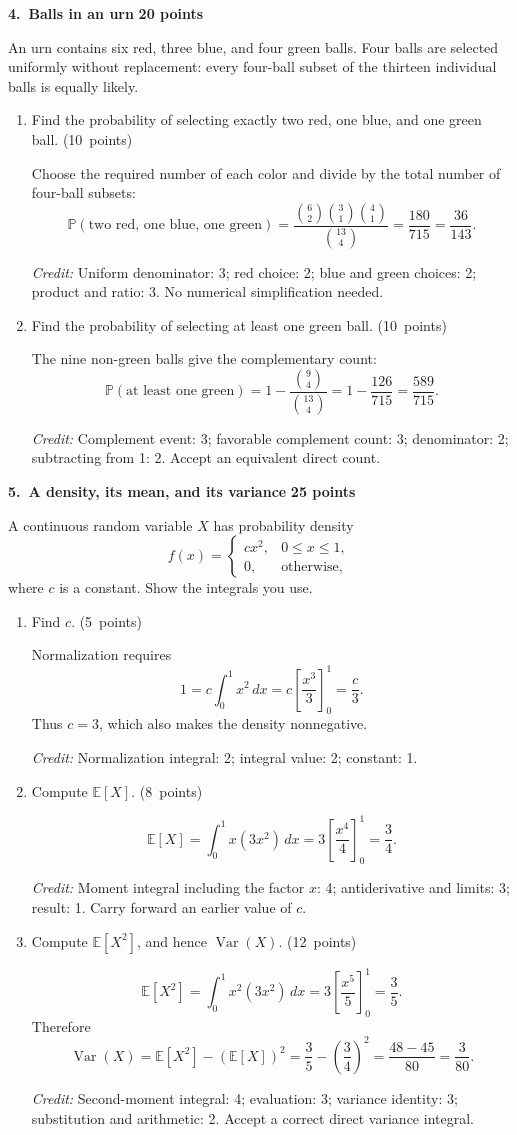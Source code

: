 \documentclass[11pt,letterpaper]{article}
\newcommand{\Prob}{\mathbb P}
\newcommand{\E}{\mathbb E}
\DeclareMathOperator{\Var}{Var}
\newcommand{\partpts}[1]{\unskip\nobreak\hspace{.3em}%
  \mbox{\small\color{muted}(#1 points)}}
\newcommand{\credit}[1]{\par{\footnotesize\color{muted}\textit{Credit:} #1}}
\newcommand{\problem}[3]{\par\addvspace{9pt}%
  {\large\bfseries\color{indigo}#1.\ #2}\hfill
  {\small\color{muted}\textbf{#3 points}}\par\nobreak}
\begin{document}
\problem{4}{Balls in an urn}{20}
An urn contains six red, three blue, and four green balls. Four balls are
selected uniformly without replacement: every four-ball subset of the
thirteen individual balls is equally likely.
\begin{enumerate}
\item Find the probability of selecting exactly two red, one blue,
and one green ball. \partpts{10}
\begin{solution}[1.25in]
Choose the required number of each color and divide by the total number
of four-ball subsets:
\[
\Prob(\text{two red, one blue, one green})
=\frac{\binom62\binom31\binom41}{\binom{13}4}
=\frac{180}{715}=\frac{36}{143}.
\]
\credit{Uniform denominator: 3; red choice: 2; blue and green choices: 2;
product and ratio: 3. No numerical simplification needed.}
\end{solution}
\item Find the probability of selecting at least one green ball. \partpts{10}
\begin{solution}[1.25in]
The nine non-green balls give the complementary count:
\[
\Prob(\text{at least one green})
=1-\frac{\binom94}{\binom{13}4}
=1-\frac{126}{715}=\frac{589}{715}.
\]
\credit{Complement event: 3; favorable complement count: 3;
denominator: 2; subtracting from 1: 2. Accept an equivalent direct count.}
\end{solution}
\end{enumerate}

\newpage
\problem{5}{A density, its mean, and its variance}{25}
A continuous random variable $X$ has probability density
\[
f(x)=\begin{cases}cx^2,&0\le x\le1,\\0,&\text{otherwise},\end{cases}
\]
where $c$ is a constant. Show the integrals you use.
\begin{enumerate}
\item Find $c$. \partpts{5}
\begin{solution}[1.4in]
Normalization requires
\[
1=c\int_0^1x^2\,dx=c\left[\frac{x^3}{3}\right]_0^1=\frac c3.
\]
Thus $c=3$, which also makes the density nonnegative.
\credit{Normalization integral: 2; integral value: 2; constant: 1.}
\end{solution}
\item Compute $\E[X]$. \partpts{8}
\begin{solution}[1.5in]
\[
\E[X]=\int_0^1x(3x^2)\,dx
=3\left[\frac{x^4}{4}\right]_0^1=\frac34.
\]
\credit{Moment integral including the factor $x$: 4;
antiderivative and limits: 3; result: 1. Carry forward an earlier value of $c$.}
\end{solution}
\item Compute $\E[X^2]$, and hence $\Var(X)$. \partpts{12}
\begin{solution}[2in]
\[
\E[X^2]=\int_0^1x^2(3x^2)\,dx
=3\left[\frac{x^5}{5}\right]_0^1=\frac35.
\]
Therefore
\[
\Var(X)=\E[X^2]-(\E[X])^2
=\frac35-\left(\frac34\right)^2
=\frac{48-45}{80}=\frac3{80}.
\]
\credit{Second-moment integral: 4; evaluation: 3; variance identity: 3;
substitution and arithmetic: 2. Accept a correct direct variance integral.}
\end{solution}
\end{enumerate}
\end{document}
